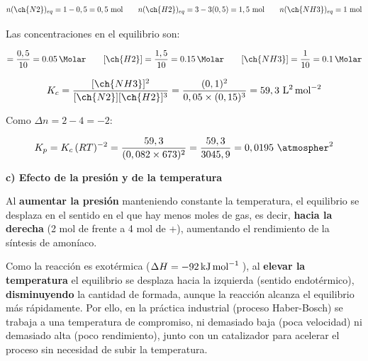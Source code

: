 \begin{exerciseEVAU}
\begin{solu}
        \begin{equation*}
            n(\ch{N2})_{eq} = 1 - 0,5 = 0,5 \ \text{mol} \qquad n(\ch{H2})_{eq} = 3 - 3(0,5) = 1,5 \ \text{mol} \qquad n(\ch{NH3})_{eq} = 1 \ \text{mol}
        \end{equation*}

        Las concentraciones en el equilibrio son:

        \begin{equation*}
            [\ch{N2}] = \dfrac{0,5}{10} = \SI{0.05}{\Molar} \qquad [\ch{H2}] = \dfrac{1,5}{10} = \SI{0.15}{\Molar} \qquad [\ch{NH3}] = \dfrac{1}{10} = \SI{0.1}{\Molar}
        \end{equation*}

        \begin{equation*}
            K_c = \dfrac{[\ch{NH3}]^2}{[\ch{N2}][\ch{H2}]^3} = \dfrac{(0,1)^2}{0,05 \times (0,15)^3} = 59,3 \ \si{\square\litre\per\square\mole}
        \end{equation*}

        Como \(\Delta n = 2 - 4 = -2\):

        \begin{equation*}
            K_p = K_c\, (R T)^{-2} = \dfrac{59,3}{(0,082 \times 673)^2} = \dfrac{59,3}{3045,9} = 0,0195 \ \si{\per\square\atmospher}
        \end{equation*}

        \textbf{c) Efecto de la presión y de la temperatura}

        Al \textbf{aumentar la presión} manteniendo constante la temperatura, el equilibrio se desplaza en el sentido en el que hay menos moles de gas, es decir, \textbf{hacia la derecha} (2 mol de  frente a 4 mol de +), aumentando el rendimiento de la síntesis de amoníaco.

        Como la reacción es exotérmica (\(\Delta H = \energia[kjmol]{-92}\)), al \textbf{elevar la temperatura} el equilibrio se desplaza hacia la izquierda (sentido endotérmico), \textbf{disminuyendo} la cantidad de  formada, aunque la reacción alcanza el equilibrio más rápidamente. Por ello, en la práctica industrial (proceso Haber-Bosch) se trabaja a una temperatura de compromiso, ni demasiado baja (poca velocidad) ni demasiado alta (poco rendimiento), junto con un catalizador para acelerar el proceso sin necesidad de subir la temperatura.

    \end{solu}

\end{exerciseEVAU}

